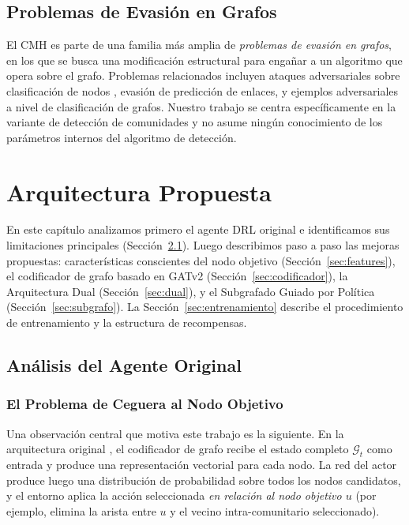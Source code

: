 \documentclass[11pt,a4paper,twoside]{tesis}
\newcommand{\G}{\mathcal{G}}
\begin{document}
\section{Problemas de Evasión en Grafos}
\label{sec:evasion}

El CMH es parte de una familia más amplia de \emph{problemas de evasión en grafos}, en
los que se busca una modificación estructural para engañar a un algoritmo que opera
sobre el grafo. Problemas relacionados incluyen ataques adversariales sobre clasificación
de nodos \cite{kipf2017semi}, evasión de predicción de enlaces, y ejemplos adversariales
a nivel de clasificación de grafos. Nuestro trabajo se centra específicamente en la
variante de detección de comunidades y no asume ningún conocimiento de los parámetros
internos del algoritmo de detección.


\chapter{Arquitectura Propuesta}
\label{ch:architecture}

En este capítulo analizamos primero el agente DRL original e identificamos sus
limitaciones principales (Sección~\ref{sec:analisis}). Luego describimos paso a paso
las mejoras propuestas: características conscientes del nodo objetivo
(Sección~\ref{sec:features}), el codificador de grafo basado en GATv2
(Sección~\ref{sec:codificador}), la Arquitectura Dual (Sección~\ref{sec:dual}), y el
Subgrafado Guiado por Política (Sección~\ref{sec:subgrafo}). La
Sección~\ref{sec:entrenamiento} describe el procedimiento de entrenamiento y la
estructura de recompensas.

\section{Análisis del Agente Original}
\label{sec:analisis}

\subsection{El Problema de Ceguera al Nodo Objetivo}

Una observación central que motiva este trabajo es la siguiente. En la arquitectura
original \cite{bernini-2024}, el codificador de grafo recibe el estado completo $\G_t$
como entrada y produce una representación vectorial para cada nodo. La red del actor
produce luego una distribución de probabilidad sobre todos los nodos candidatos, y el
entorno aplica la acción seleccionada \emph{en relación al nodo objetivo $u$} (por
ejemplo, elimina la arista entre $u$ y el vecino intra-comunitario seleccionado).
\end{document}
